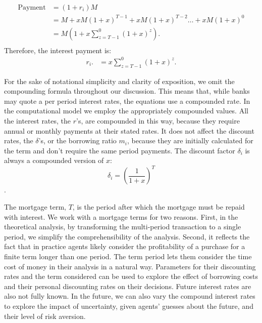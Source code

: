 \begin{align*}
\text{Payment} &= (1+r_i)M                                 \\ 
    &= M + xM(1+x)^{T-1}+ xM(1+x)^{T-2}\dots + xM(1+x)^{0} \\
    &= M\left(1+ x\sum_{z=T-1}^0(1+x)^{z}\right).          \\ 
\end{align*}
Therefore, the interest payment is:
\begin{align*}
r_i.   &=x\sum_{z=T-1}^0(1+x)^{z}.
\end{align*}

For the sake of notational simplicity and clarity of exposition,  we omit the compounding formula throughout our discussion. This means that, while banks may quote a per period interest rates, the equations use a compounded rate. In the computational model we employ the appropriately compounded values. All %
 the interest rates, the $r$'s, are compounded in this way, because they require annual or monthly payments at their stated rates.
 It does not affect the discount rates, the $\delta$'s, or the borrowing ratio $m_i$, because they are initially calculated for the term and don't require the same period payments.
 The discount factor $\delta_i$ is always a compounded version of $x$:
 \[\delta_i=\left(\frac{1}{1+x}\right)^T\].

 The {mortgage term}, $T$, is the period after which the mortgage must be repaid with interest. We work with a mortgage terms for two reasons. First, in the theoretical analysis, by transforming the multi-period transaction to a single period, we simplify the comprehensibility of the analysis. Second, it reflects the fact that in practice agents  likely consider the profitability of a purchase for a finite term longer than one period. The term period lets them consider the time cost of money in their analysis in a natural way. Parameters for their discounting rates and the term considered can be used to explore the effect of borrowing costs and their personal discounting rates on their decisions. Future interest rates are also not fully known. In the future, we can also vary the compound interest rates to explore the impact of uncertainty, given agents' guesses about the future, and their level of risk aversion.

